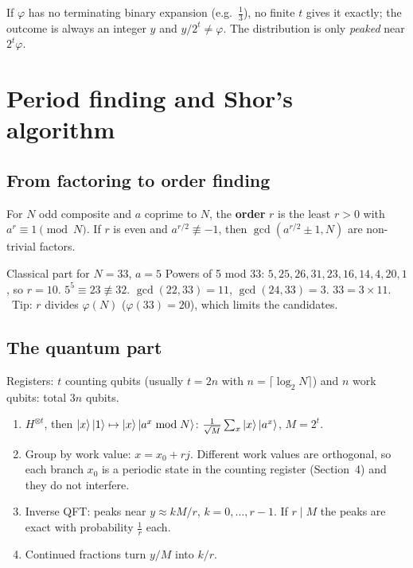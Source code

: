 \documentclass[11pt,a4paper,openany]{book}
\newcounter{wex}[chapter]
\newenvironment{steps}{\begin{enumerate}[label=\textbf{Step \arabic*.}, leftmargin=4.2em, itemsep=2pt]}{\end{enumerate}}
\begin{document}
\begin{trap}
If $\varphi$ has no terminating binary expansion (e.g.\ $\frac13$), no finite $t$ gives it exactly; the outcome is always an
integer $y$ and $y/2^t \neq \varphi$. The distribution is only \emph{peaked} near $2^t\varphi$.
\end{trap}

\section{Period finding and Shor's algorithm}
\subsection{From factoring to order finding}
For $N$ odd composite and $a$ coprime to $N$, the \textbf{order} $r$ is the least $r > 0$ with $a^r \equiv 1 \pmod N$. If $r$ is even
and $a^{r/2} \not\equiv -1$, then $\gcd(a^{r/2} \pm 1, N)$ are non-trivial factors.
\begin{wexample}{Classical part for $N = 33$, $a = 5$}
Powers of 5 mod 33: $5, 25, 26, 31, 23, 16, 14, 4, 20, 1$, so $r = 10$. $5^5 \equiv 23 \not\equiv 32$. $\gcd(22, 33) = 11$, $\gcd(24, 33) = 3$.
$33 = 3\times11$. \checkmark\ Tip: $r$ divides $\varphi(N)$ ($\varphi(33) = 20$), which limits the candidates.
\end{wexample}

\subsection{The quantum part}
Registers: $t$ counting qubits (usually $t = 2n$ with $n = \lceil\log_2N\rceil$) and $n$ work qubits: total $3n$ qubits.
\begin{steps}
\item $H^{\otimes t}$, then $\ket x\ket1 \mapsto \ket x\ket{a^x \bmod N}$: $\frac{1}{\sqrt M}\sum_x\ket x\ket{a^x}$, $M = 2^t$.
\item Group by work value: $x = x_0 + rj$. Different work values are orthogonal, so each branch $x_0$ is a periodic
      state in the counting register (Section~4) and they do not interfere.
\item Inverse QFT: peaks near $y \approx kM/r$, $k = 0, \dots, r-1$. If $r \mid M$ the peaks are exact with probability $\frac1r$ each.
\item Continued fractions turn $y/M$ into $k/r$.
\end{steps}
\end{document}
